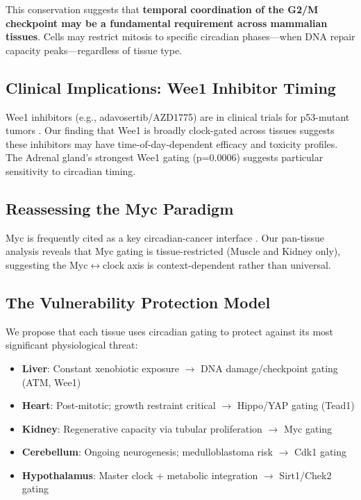 \documentclass[11pt,a4paper]{article}
\begin{document}
This conservation suggests that \textbf{temporal coordination of the G2/M checkpoint may be a fundamental requirement across mammalian tissues}. Cells may restrict mitosis to specific circadian phases---when DNA repair capacity peaks---regardless of tissue type.

\subsection{Clinical Implications: Wee1 Inhibitor Timing}

Wee1 inhibitors (e.g., adavosertib/AZD1775) are in clinical trials for p53-mutant tumors \citep{leijen2016}. Our finding that Wee1 is broadly clock-gated across tissues suggests these inhibitors may have time-of-day-dependent efficacy and toxicity profiles. The Adrenal gland's strongest Wee1 gating (p=0.0006) suggests particular sensitivity to circadian timing.

\subsection{Reassessing the Myc Paradigm}

Myc is frequently cited as a key circadian-cancer interface \citep{altman2015}. Our pan-tissue analysis reveals that Myc gating is tissue-restricted (Muscle and Kidney only), suggesting the Myc$\leftrightarrow$clock axis is context-dependent rather than universal.

\subsection{The Vulnerability Protection Model}

We propose that each tissue uses circadian gating to protect against its most significant physiological threat:

\begin{itemize}[noitemsep]
    \item \textbf{Liver}: Constant xenobiotic exposure $\rightarrow$ DNA damage/checkpoint gating (ATM, Wee1)
    \item \textbf{Heart}: Post-mitotic; growth restraint critical $\rightarrow$ Hippo/YAP gating (Tead1)
    \item \textbf{Kidney}: Regenerative capacity via tubular proliferation $\rightarrow$ Myc gating
    \item \textbf{Cerebellum}: Ongoing neurogenesis; medulloblastoma risk $\rightarrow$ Cdk1 gating
    \item \textbf{Hypothalamus}: Master clock + metabolic integration $\rightarrow$ Sirt1/Chek2 gating
\end{itemize}
\end{document}
